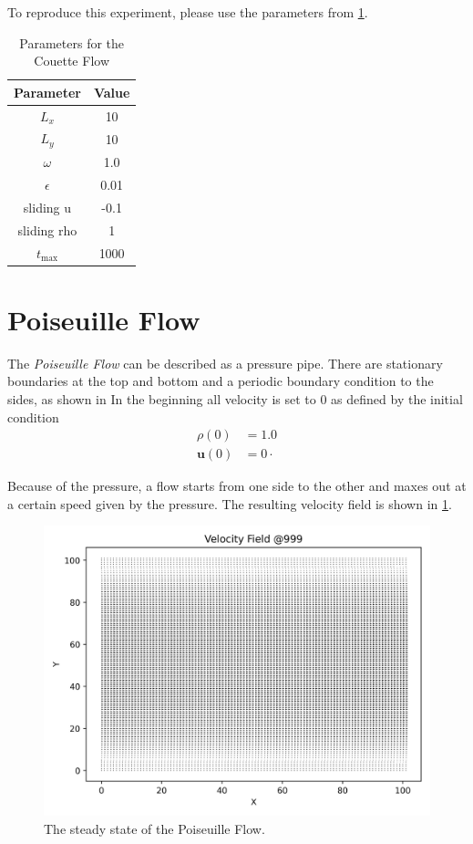To reproduce this experiment, please use the parameters from \cref{tab:cf-parameters}.

\begin{table}[H]
    \centering %
    \begin{tabular}{c c}
        \hline\hline %
        Parameter   & Value \\ [0.5ex] %
        \hline %
        $L_x$       & 10    \\
        $L_y$       & 10    \\
        $\omega$    & 1.0   \\
        $\epsilon$  & 0.01  \\
        sliding u   & -0.1  \\
        sliding rho & 1     \\
        $t_{\max}$  & 1000  \\ [1ex] %
        \hline %
    \end{tabular}
    \caption{Parameters for the Couette Flow} %
    \label{tab:cf-parameters}
\end{table}


\section{Poiseuille Flow}
The \textit{Poiseuille Flow} can be described as a pressure pipe.
There are stationary boundaries at the top and bottom and a periodic boundary condition to the sides, as shown in %
In the beginning all velocity is set to 0 as defined by the initial condition
\begin{equation*}
    \begin{aligned}
        \rho(0) &= 1.0 \\
        \mathbf{u}(0) &= 0 \cdot
    \end{aligned}
\end{equation*}

Because of the pressure, a flow starts from one side to the other and maxes out at a certain speed given by the pressure.
The resulting velocity field is shown in \cref{fig:pf-velocity-field}.
\begin{figure}[H]
    \begin{center}
        \includegraphics[width=0.5\linewidth]{graphs/PoiseuilleFlow/velocity_field_999}
        \caption{The steady state of the Poiseuille Flow.}
        \label{fig:pf-velocity-field}
    \end{center}
\end{figure}

